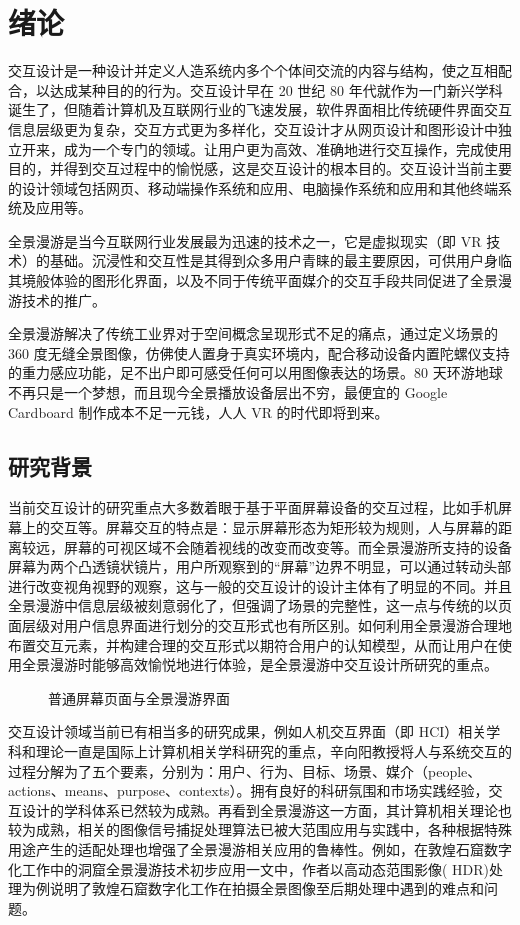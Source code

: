 \chapter{绪论}

交互设计是一种设计并定义人造系统内多个个体间交流的内容与结构，使之互相配合，以达成某种目的的行为。交互设计早在 20 世纪 80 年代就作为一门新兴学科诞生了，但随着计算机及互联网行业的飞速发展，软件界面相比传统硬件界面交互信息层级更为复杂，交互方式更为多样化，交互设计才从网页设计和图形设计中独立开来，成为一个专门的领域。让用户更为高效、准确地进行交互操作，完成使用目的，并得到交互过程中的愉悦感，这是交互设计的根本目的。交互设计当前主要的设计领域包括网页、移动端操作系统和应用、电脑操作系统和应用和其他终端系统及应用等。

全景漫游是当今互联网行业发展最为迅速的技术之一，它是虚拟现实（即 VR 技术）的基础。沉浸性和交互性是其得到众多用户青睐的最主要原因，可供用户身临其境般体验的图形化界面，以及不同于传统平面媒介的交互手段共同促进了全景漫游技术的推广。

全景漫游解决了传统工业界对于空间概念呈现形式不足的痛点，通过定义场景的 360 度无缝全景图像，仿佛使人置身于真实环境内，配合移动设备内置陀螺仪支持的重力感应功能，足不出户即可感受任何可以用图像表达的场景。80 天环游地球不再只是一个梦想，而且现今全景播放设备层出不穷，最便宜的 Google Cardboard 制作成本不足一元钱，人人 VR 的时代即将到来。

\section{研究背景}
当前交互设计的研究重点大多数着眼于基于平面屏幕设备的交互过程，比如手机屏幕上的交互等。屏幕交互的特点是：显示屏幕形态为矩形较为规则，人与屏幕的距离较远，屏幕的可视区域不会随着视线的改变而改变等。而全景漫游所支持的设备屏幕为两个凸透镜状镜片，用户所观察到的“屏幕”边界不明显，可以通过转动头部进行改变视角视野的观察，这与一般的交互设计的设计主体有了明显的不同。并且全景漫游中信息层级被刻意弱化了，但强调了场景的完整性，这一点与传统的以页面层级对用户信息界面进行划分的交互形式也有所区别。如何利用全景漫游合理地布置交互元素，并构建合理的交互形式以期符合用户的认知模型，从而让用户在使用全景漫游时能够高效愉悦地进行体验，是全景漫游中交互设计所研究的重点。

\begin{figure}[htp]
\centering
{}
\caption{普通屏幕页面与全景漫游界面}
\label{fig:screen}
\end{figure}

交互设计领域当前已有相当多的研究成果，例如人机交互界面（即 HCI）相关学科和理论一直是国际上计算机相关学科研究的重点，辛向阳教授将人与系统交互的过程分解为了五个要素，分别为：用户、行为、目标、场景、媒介（people、actions、means、purpose、contexts）。拥有良好的科研氛围和市场实践经验，交互设计的学科体系已然较为成熟。再看到全景漫游这一方面，其计算机相关理论也较为成熟，相关的图像信号捕捉处理算法已被大范围应用与实践中，各种根据特殊用途产生的适配处理也增强了全景漫游相关应用的鲁棒性。例如，在敦煌石窟数字化工作中的洞窟全景漫游技术初步应用一文中，作者以高动态范围影像( HDR)处理为例说明了敦煌石窟数字化工作在拍摄全景图像至后期处理中遇到的难点和问题。

